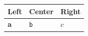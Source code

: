 \begin{frame}[t]
\par\addvspace{\medskipamount}
\noindent\begin{tabularx}{\linewidth}{@{}>{\raggedright\arraybackslash}X>{\centering\arraybackslash}X>{\raggedleft\arraybackslash}X@{}}
\toprule
Left & Center & Right \\
\midrule
\textbf{a} & \texttt{b} & $c$ \\
\bottomrule
\end{tabularx}
\par\addvspace{\medskipamount}
\end{frame}

